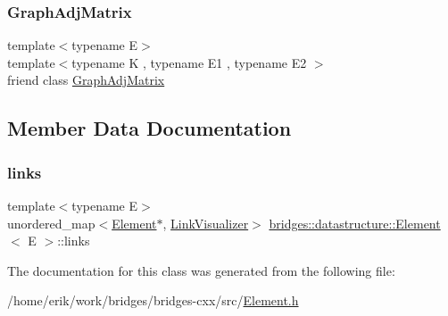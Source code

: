 \subsubsection{\texorpdfstring{Graph\+Adj\+Matrix}{GraphAdjMatrix}}
{\footnotesize\ttfamily template$<$typename E$>$ \\
template$<$typename K , typename E1 , typename E2 $>$ \\
friend class \hyperlink{classbridges_1_1datastructure_1_1_graph_adj_matrix}{Graph\+Adj\+Matrix}\hspace{0.3cm}{\ttfamily [friend]}}



\subsection{Member Data Documentation}
\mbox{\label{classbridges_1_1datastructure_1_1_element_ac296ae66e6b04e95f31f4134228524f8}} 
\subsubsection{\texorpdfstring{links}{links}}
{\footnotesize\ttfamily template$<$typename E$>$ \\
unordered\+\_\+map$<$\hyperlink{classbridges_1_1datastructure_1_1_element}{Element}$\ast$, \hyperlink{classbridges_1_1datastructure_1_1_link_visualizer}{Link\+Visualizer}$>$ \hyperlink{classbridges_1_1datastructure_1_1_element}{bridges\+::datastructure\+::\+Element}$<$ E $>$\+::links\hspace{0.3cm}{\ttfamily [protected]}}



The documentation for this class was generated from the following file\+:\begin{DoxyCompactItemize}
\item 
/home/erik/work/bridges/bridges-\/cxx/src/\hyperlink{_element_8h}{Element.\+h}\end{DoxyCompactItemize}
